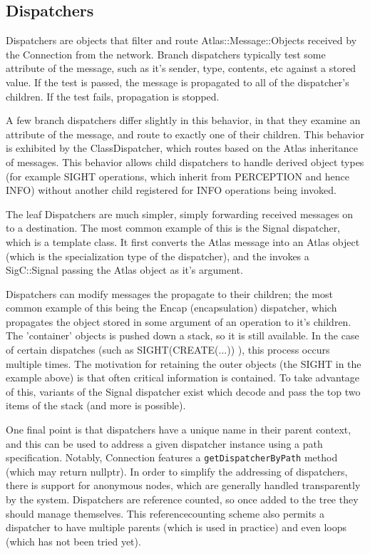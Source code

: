 \subsection{Dispatchers}



Dispatchers are objects that filter and route Atlas::Message::Objects received by the Connection
from the network. Branch dispatchers typically test some attribute of the message, such as it's
sender, type, contents, etc against a stored value. If the test is passed, the message is
propagated to all of the dispatcher's children. If the test fails, propagation is stopped.



A few branch dispatchers differ slightly in this behavior, in that they examine an
attribute of the message, and route to exactly one of their children. This behavior is exhibited
by the ClassDispatcher, which routes based on the Atlas inheritance of messages. This
behavior allows child dispatchers to handle derived object types (for example SIGHT operations, which
inherit from PERCEPTION and hence INFO) without another child registered for INFO operations being invoked.



The leaf Dispatchers are much simpler, simply forwarding received messages
on to a destination. The most common example of this is the Signal dispatcher, which
is a template class. It first converts the Atlas message into an Atlas object (which
is the specialization type of the dispatcher), and the invokes a SigC::Signal passing
the Atlas object as it's argument.



Dispatchers can modify messages the propagate to their children; the most common
example of this being the Encap (encapsulation) dispatcher, which propagates the object
stored in some argument of an operation to it's children. The 'container' objects is pushed
down a stack, so it is still available. In the case of certain dispatches
(such as SIGHT(CREATE(...)) ), this process occurs multiple times. The motivation for retaining
the outer objects (the SIGHT in the example above) is that often critical information is
contained. To take advantage of this, variants of the Signal dispatcher exist which
decode and pass the top two items of the stack (and more is possible).



One final point is that dispatchers have a unique name in their parent context, and
this can be used to address a given dispatcher instance using a path specification. Notably,
Connection features a {\tt getDispatcherByPath} method (which may return nullptr). In order
to simplify the addressing of dispatchers, there is support for anonymous nodes, which
are generally handled transparently by the system. Dispatchers are reference counted,
so once added to the tree they should manage themselves. This referencecounting scheme
also permits a dispatcher to have multiple parents (which is used in practice) and even
loops (which has not been tried yet).



